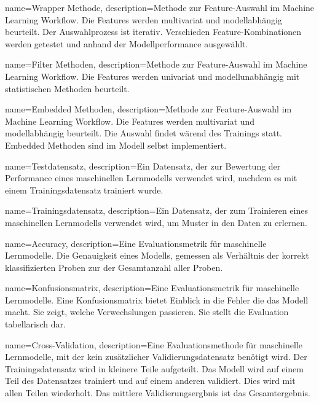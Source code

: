 {
        name=Wrapper Methode,
        description={Methode zur Feature-Auswahl im Machine Learning Workflow. Die Features werden multivariat und modellabhängig beurteilt. Der Auswahlprozess ist iterativ. Verschieden Feature-Kombinationen werden getestet und anhand der Modellperformance ausgewählt. }
}

{
        name=Filter Methoden,
        description={Methode zur Feature-Auswahl im Machine Learning Workflow. Die Features werden univariat und modellunabhängig mit statistischen Methoden beurteilt. }
}

{
        name=Embedded Methoden,
        description={Methode zur Feature-Auswahl im Machine Learning Workflow. Die Features werden multivariat und modellabhängig beurteilt. Die Auswahl findet wärend des Trainings statt. Embedded Methoden sind im Modell selbst implementiert.}
}

{
        name=Testdatensatz,
        description={Ein Datensatz, der zur Bewertung der Performance eines maschinellen Lernmodells verwendet wird, nachdem es mit einem Trainingsdatensatz trainiert wurde.}
}

{
        name=Trainingsdatensatz,
        description={Ein Datensatz, der zum Trainieren eines maschinellen Lernmodells verwendet wird, um Muster in den Daten zu erlernen.}
}

{
        name=Accuracy,
        description={Eine Evaluationsmetrik für maschinelle Lernmodelle. Die Genauigkeit eines Modells, gemessen als Verhältnis der korrekt klassifizierten Proben zur der Gesamtanzahl aller Proben.}
}

{
        name=Konfusionsmatrix,
        description={Eine Evaluationsmetrik für maschinelle Lernmodelle. Eine Konfusionsmatrix bietet Einblick in die Fehler die das Modell macht. Sie zeigt, welche Verwechslungen passieren. Sie stellt die Evaluation tabellarisch dar.}
}

{
        name=Cross-Validation,
        description={Eine Evaluationsmethode für maschinelle Lernmodelle, mit der kein zusätzlicher Validierungsdatensatz benötigt wird. Der Trainingsdatensatz wird in kleinere Teile aufgeteilt. Das Modell wird auf einem Teil des Datensatzes trainiert und auf einem anderen validiert. Dies wird mit allen Teilen wiederholt. Das mittlere Validierungsergbnis ist das Gesamtergebnis.}
}

